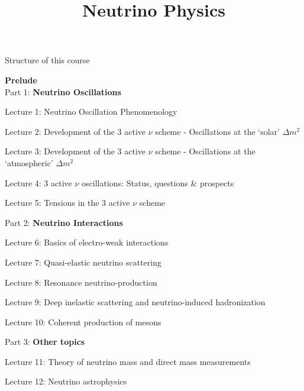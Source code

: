 %
%

\title[Neutrino Physics]
{
  \Huge{Neutrino Physics}
}



\begin{frame}[plain]
  \titlepage
\end{frame}


\begin{frame}{Structure of this course}

{\scriptsize

{\bf Prelude} \\

Part 1: {\bf Neutrino Oscillations} \\
\begin{itemize}
{\scriptsize
  \item {\color{magenta} Lecture 1: } Neutrino Oscillation Phenomenology
  \item {\color{magenta} Lecture 2: } Development of the 3 active $\nu$ scheme - Oscillations at the `solar' ${\Delta}m^{2}$
  \item {\color{magenta} Lecture 3: } Development of the 3 active $\nu$ scheme - Oscillations at the `atmospheric' ${\Delta}m^{2}$
  \item {\color{magenta} Lecture 4: } 3 active $\nu$ oscillations: Status, questions \& prospects
  \item {\color{magenta} Lecture 5: } Tensions in the 3 active $\nu$ scheme
}
\end{itemize}

Part 2: {\bf Neutrino Interactions} \\
\begin{itemize}
{\scriptsize
  \item {\color{magenta} Lecture 6: } Basics of electro-weak interactions
  \item {\color{magenta} Lecture 7: } Quasi-elastic neutrino scattering
  \item {\color{magenta} Lecture 8: } Resonance neutrino-production
  \item {\color{magenta} Lecture 9: } Deep inelastic scattering and neutrino-induced hadronization
  \item {\color{magenta} Lecture 10:} Coherent production of mesons
}
\end{itemize}

Part 3: {\bf Other topics} \\
\begin{itemize}
{\scriptsize
  \item {\color{magenta} Lecture 11:} Theory of neutrino mass and direct mass measurements
  \item {\color{magenta} Lecture 12:} Neutrino astrophysics
}
\end{itemize}

}
\end{frame}

